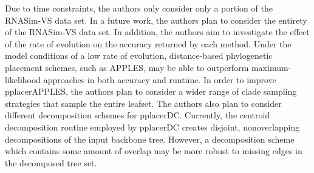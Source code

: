 \documentclass[10pt]{article}
\begin{document}
Due to time constraints, the authors only consider only a portion of the RNASim-VS data set.
In a future work, the authors plan to consider the entirety of the RNASim-VS data set.
In addition, the authors aim to investigate the effect of the rate of evolution on the accuracy
returned by each method.
Under the model conditions of a low rate of evolution, distance-based phylogenetic placement schemes,
such as APPLES, may be able to outperform maximum-likelihood approaches in both accuracy and runtime.
In order to improve pplacerAPPLES, the authors plan to consider a wider range of clade sampling
strategies that sample the entire leafset.
The authors also plan to consider different decomposition schemes for pplacerDC.
Currently, the centroid decomposition routine employed by pplacerDC creates disjoint, nonoverlapping
decompositions of the input backbone tree.
However, a decomposition scheme which contains some amount of overlap may be more robust to missing
edges in the decomposed tree set.



\end{document}
